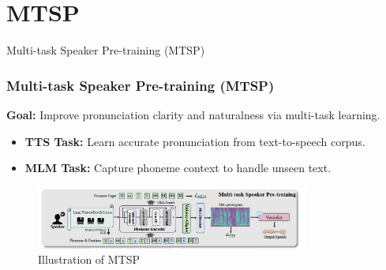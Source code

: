 \section{MTSP}

\begin{frame}{Multi-task Speaker Pre-training (MTSP)}
    \frametitle{Multi-task Speaker Pre-training (MTSP)}
    \textbf{Goal:} Improve pronunciation clarity and naturalness via multi-task learning.
    \begin{itemize}
        \item \textbf{TTS Task:} Learn accurate pronunciation from text-to-speech corpus.
        \item \textbf{MLM Task:} Capture phoneme context to handle unseen text.
    \end{itemize}
    \begin{figure}
        \centering
        \includegraphics[width=0.8\textwidth]{figs/MSTP.png}
        \caption{Illustration of MTSP}
        \label{fig:mtsp}
    \end{figure}
\end{frame}

